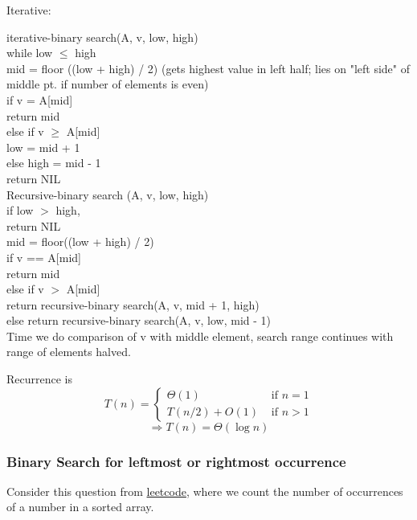\documentclass[10pt]{amsart}
\begin{document}
\begin{multicols*}{2}
Iterative:

iterative-binary search(A, v, low, high) \\
\quad while low $\leq$ high \\
\quad \quad mid = floor ((low + high) / 2) (gets highest value in left half; lies on "left side" of middle pt. if number of elements is even) \\
\quad \quad if v = A[mid] \\
\quad \quad \quad return mid \\
\quad \quad else if v $\geq $ A[mid] \\
\quad \quad \quad low = mid + 1 \\
\quad \quad else high = mid - 1 \\
\quad return NIL \\

Recursive-binary search (A, v, low, high) \\
\quad if low $>$ high, \\
\quad \quad return NIL \\
\quad mid  = floor((low + high) / 2) \\
\quad if v == A[mid] \\
\quad \quad return mid \\
\quad else if v $>$ A[mid] \\
\quad \quad return recursive-binary search(A, v, mid + 1, high) \\
\quad else return recursive-binary search(A, v, low, mid - 1) \\

Time we do comparison of v with middle element, search range continues with range of elements halved.

Recurrence is 
\[
T(n) = \begin{cases} \Theta(1) & \text{ if } n = 1 \\
	T(n/2) + O(1) & \text{ if } n > 1 \end{cases}
\]
\[
\Longrightarrow T(n) = \Theta(\log{n})
\]

\subsubsection{Binary Search for leftmost or rightmost occurrence}

Consider this question from \href{https://leetcode.com/discuss/interview-question/algorithms/124724/facebook-onsite-count-occurrences-of-a-number-in-a-sorted-array}{leetcode}, where we count the number of occurrences of a number in a sorted array.


\end{multicols*}
\end{document}
